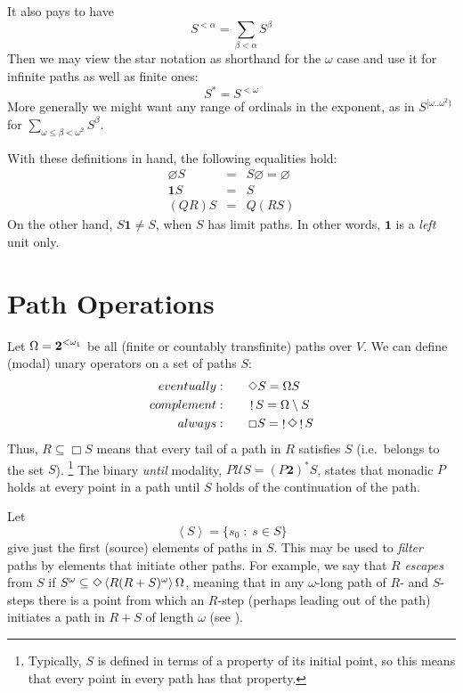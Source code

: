 \documentclass{llncs}
\newcommand{\ABC}{V}
\newcommand{\Pair}{\textbf{2}}
\newcommand{\One}{\textbf{1}}
\let\om=\Omega
\renewcommand{\Omega}{{\rm\om}}
\newcommand{\Bang}[1]{\mathop!#1}
\newcommand{\Filter}[1]{\left\langle#1\right\rangle}
\begin{document}
It also pays to have
\[
S^{<\alpha}  = \sum_{\beta<\alpha} S^{\beta} 
\]
Then we may view the star notation as shorthand for the $\omega$ case
and use it for infinite paths as well as finite ones:
\[
S^* =S^{<\omega}
\]
More generally we might want any range of ordinals in the exponent, as in $S^{[\omega..\omega^2)}$
for $\sum_{\omega\leq\beta<\omega^2}S^\beta$.


With these definitions in hand, the following equalities hold:
\begin{eqnarray*}
\varnothing S &=&  S \varnothing = \varnothing\\
\One S &=& S\\
(QR)S &=& Q(RS)
\end{eqnarray*}
On the other hand, $S \One \neq S$, when $S$ has limit paths.
In other words, $\One$ is a \textit{left} unit only.

\section{Path Operations}

Let
$\Omega=\Pair^{<\omega_1}$ be all (finite or countably transfinite) paths over $\ABC$.
We can define (modal) unary operators on a set of paths $S$:
\begin{align*}
eventually:\qquad & \Diamond S  =\Omega S  \\
complement:\qquad & \Bang S = \Omega\setminus S \\
always:\qquad & \Box S  = \Bang{\Diamond \Bang S} 
\end{align*}
Thus,
$R \subseteq  \Box S$ means that every tail of a path in $R$ satisfies $S$ (i.e.\ belongs to the set $S$).%
\footnote{Typically, $S$ is defined in terms of a property of its initial point, so this means that
every point in every path has that property.}
The binary \emph{until} modality,
$P \mathrel{\mathcal{U}} S  = (P\Pair)^\ast S $,
states that monadic $P$ holds at every point in a path until $S$ holds of the continuation of the path.

Let
\[
\Filter S =  \{s_0 \;\colon\; s\in S\} 
\]
give just the first (source) elements of paths in $S$.
This may be used to \emph{filter} paths by elements that
initiate other paths.
For example, we say that
$R$ \emph{escapes} from $S$ if $S^\omega \subseteq \Diamond \Filter {R (R+S)^\omega} \Omega$,
meaning that in any $\omega$-long path of $R$- and $S$-steps there is a point from
which an $R$-step (perhaps leading out of the path) initiates a path in $R+S$ of length $\omega$
(see \cite{Jump}).
\end{document}
